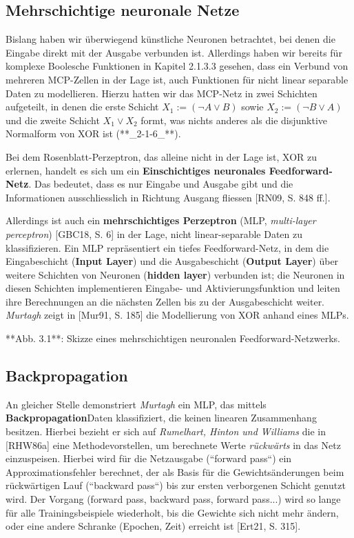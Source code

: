 \subsection{Mehrschichtige neuronale Netze}

Bislang haben wir überwiegend künstliche Neuronen betrachtet, bei denen die Eingabe direkt mit der Ausgabe verbunden ist. Allerdings haben wir bereits für komplexe Boolesche Funktionen in Kapitel 2.1.3.3 gesehen, dass ein Verbund von mehreren MCP-Zellen in der Lage ist, auch Funktionen für nicht linear separable Daten zu modellieren. Hierzu hatten wir das MCP-Netz in zwei Schichten aufgeteilt, in denen die erste Schicht $X_1 := (\neg A \lor B)$ sowie $X_2 := (\neg B \lor A)$ und die zweite Schicht $X_1 \lor X_2$ formt, was nichts anderes als die disjunktive Normalform von XOR ist (**_2-1-6_**).

Bei dem Rosenblatt-Perzeptron, das alleine nicht in der Lage ist, XOR zu erlernen, handelt es sich um ein \textbf{Einschichtiges neuronales Feedforward-Netz}. Das bedeutet, dass es nur Eingabe und Ausgabe gibt und die Informationen ausschliesslich in Richtung Ausgang fliessen [RN09, S. 848 ff.].

Allerdings ist auch ein \textbf{mehrschichtiges Perzeptron} (MLP, \textit{multi-layer perceptron}) [GBC18, S. 6] in der Lage, nicht linear-separable Daten zu klassifizieren. Ein MLP repräsentiert ein tiefes Feedforward-Netz, in dem die Eingabeschicht (\textbf{Input Layer}) und die Ausgabeschicht (\textbf{Output Layer}) über weitere Schichten von Neuronen (\textbf{hidden layer}) verbunden ist; die Neuronen in diesen Schichten implementieren Eingabe- und Aktivierungsfunktion und leiten ihre Berechnungen an die nächsten Zellen bis zu der Ausgabeschicht weiter. \textit{Murtagh} zeigt in [Mur91, S. 185] die Modellierung von XOR anhand eines MLPs.

**Abb. 3.1**: Skizze eines mehrschichtigen neuronalen Feedforward-Netzwerks.

\subsection{Backpropagation}
An gleicher Stelle demonstriert \textit{Murtagh} ein MLP, das mittels \textbf{Backpropagation}\footnotemark[11] Daten klassifiziert, die keinen linearen Zusammenhang besitzen. Hierbei bezieht er sich auf \textit{Rumelhart, Hinton und Williams} die in [RHW86a] eine Methode\footnotemark[12] vorstellen, um berechnete Werte \textit{rückwärts} in das Netz einzuspeisen. Hierbei wird für die Netzausgabe (``forward pass``) ein Approximationsfehler berechnet, der als Basis für die Gewichtsänderungen beim rückwärtigen Lauf (``backward pass``) bis zur ersten verborgenen Schicht genutzt wird. Der Vorgang (forward pass, backward pass, forward pass...) wird so lange für alle Trainingsbeispiele wiederholt, bis die Gewichte sich nicht mehr ändern, oder eine andere Schranke (Epochen, Zeit) erreicht ist [Ert21, S. 315]\footnotemark[13].

